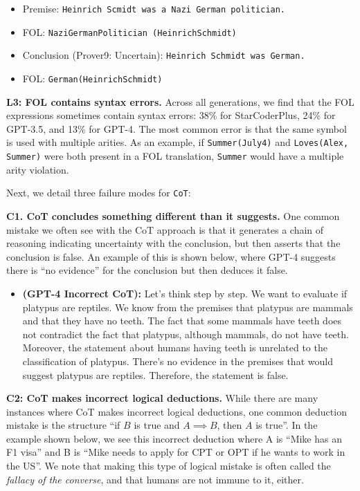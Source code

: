 \documentclass[11pt]{article}
\begin{document}
\begin{itemize}
\itemsep0.1em
    \item[] \small Premise: \texttt{Heinrich Scmidt was a Nazi German politician.}
    \item[] \small FOL: \texttt{NaziGermanPolitician (HeinrichSchmidt)}
    \item[] \small Conclusion (Prover9: Uncertain): \texttt{Heinrich Schmidt was German.}
    \item[] \small FOL: \texttt{German(HeinrichSchmidt)}
\end{itemize}

\textbf{L3: FOL contains syntax errors.}  Across all generations, we find that the FOL expressions sometimes contain syntax errors: 38\% for StarCoderPlus, 24\% for GPT-3.5, and 13\% for GPT-4. The most common error is that the same symbol is used with multiple arities. As an example, if \texttt{Summer(July4)} and \texttt{Loves(Alex, Summer)} were both present in a FOL translation, \texttt{Summer} would have a multiple arity violation.

Next, we detail three failure modes for \texttt{CoT}:

\textbf{C1. CoT concludes something different than it suggests.} One common mistake we often see with the CoT approach is that it generates a chain of reasoning indicating uncertainty with the conclusion, but then asserts that the conclusion is false. An example of this is shown below, where GPT-4 suggests there is ``no evidence'' for the conclusion but then deduces it false.

\begin{itemize}
\itemsep0.1em
    \item[] \small \textbf{(GPT-4 Incorrect CoT):} Let's think step by step. We want to evaluate if platypus are reptiles. We know from the premises that platypus are mammals and that they have no teeth. The fact that some mammals have teeth does not contradict the fact that platypus, although mammals, do not have teeth. Moreover, the statement about humans having teeth is unrelated to the classification of platypus. There's no evidence in the premises that would suggest platypus are reptiles. Therefore, the statement is false.
\end{itemize}

\textbf{C2: CoT makes incorrect logical deductions.} While there are many instances where CoT makes incorrect logical deductions, one common deduction mistake is the structure ``if $B$ is true and $A \implies B$, then $A$ is true''. In the example shown below, we see this incorrect deduction where A is ``Mike has an F1 visa'' and B is ``Mike needs to apply for CPT or OPT if he wants to work in the US''. We note that making this type of logical mistake is often called the \emph{fallacy of the converse}, and that humans are not immune to it, either.
\end{document}

